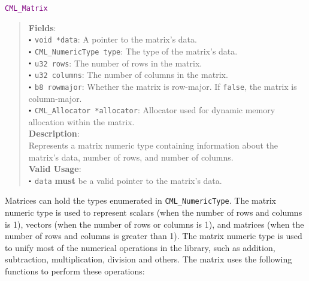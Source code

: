 \documentclass[a4paper,oneside,8pt]{extarticle}
\newcommand{\struct}[1]{
  \noindent\textcolor{purple}{\texttt{#1}}
  \vspace{-0.3em}
}
\renewcommand{\dot}{\raisebox{0.3ex}{\scalebox{0.6}{$\bullet$}}}
\theoremstyle{definition}
\begin{document}
\struct{CML\_Matrix}
\begin{quote}
  \textbf{Fields}: \\
  $\dot$ \texttt{void *data}: A pointer to the matrix's data. \\
  $\dot$ \texttt{CML\_NumericType type}: The type of the matrix's data. \\
  $\dot$ \texttt{u32 rows}: The number of rows in the matrix. \\
  $\dot$ \texttt{u32 columns}: The number of columns in the matrix. \\
  $\dot$ \texttt{b8 rowmajor}: Whether the matrix is row-major. If \texttt{false}, the matrix is column-major. \\
  $\dot$ \texttt{CML\_Allocator *allocator}: Allocator used for dynamic memory allocation within the matrix. \\
  
  \vspace{-0.75em}
  \textbf{Description}: \\
  Represents a matrix numeric type containing information about the matrix's data, number of rows, and number of columns. \\

  \vspace{-0.75em}
  \textbf{Valid Usage}: \\
  $\dot$ \texttt{data} \textbf{must} be a valid pointer to the matrix's data. \\
\end{quote}

Matrices can hold the types enumerated in \texttt{CML\_NumericType}. The matrix numeric type is used to represent scalars (when the number of rows and columns is 1), vectors (when the number of rows or columns is 1), and matrices (when the number of rows and columns is greater than 1). The matrix numeric type is used to unify most of the numerical operations in the library, such as addition, subtraction, multiplication, division and others. The matrix uses the following functions to perform these operations: \newline
\end{document}
